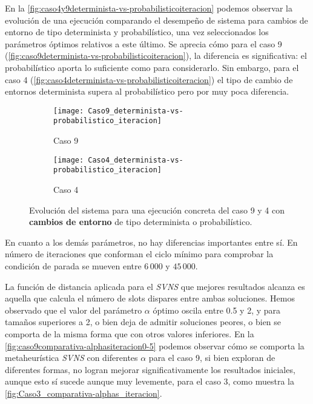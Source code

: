 En la \autoref{fig:caso4y9determinista-vs-probabilisticoiteracion} podemos observar la evolución de una ejecución comparando el desempeño de sistema para cambios de entorno de tipo determinista y probabilístico, una vez seleccionados los parámetros óptimos relativos a este último. Se aprecia cómo para el caso 9  (\autoref{fig:caso9determinista-vs-probabilisticoiteracion}), la diferencia es significativa: el probabilístico aporta lo suficiente como para considerarlo. Sin embargo, para el caso 4 (\autoref{fig:caso4determinista-vs-probabilisticoiteracion}) el tipo de cambio de entornos determinista supera al probabilístico pero por muy poca diferencia.

\begin{figure}[h]
	\begin{subfigure}{\linewidth}
		\centering
		\texttt{[image: Caso9\_determinista-vs-probabilistico\_iteracion]}
		\caption{Caso 9}
		\label{fig:caso9determinista-vs-probabilisticoiteracion}
	\end{subfigure}

	\begin{subfigure}{\linewidth}
		\centering
		\texttt{[image: Caso4\_determinista-vs-probabilistico\_iteracion]}
		\caption{Caso 4}
		\label{fig:caso4determinista-vs-probabilisticoiteracion}
	\end{subfigure}
	\caption{Evolución del sistema para una ejecución concreta del caso 9 y 4 con \textbf{cambios de entorno} de tipo determinista o probabilístico.}
	\label{fig:caso4y9determinista-vs-probabilisticoiteracion}
\end{figure}



En cuanto a los demás parámetros, no hay diferencias importantes entre sí. En número de iteraciones que conforman el ciclo mínimo para comprobar la condición de parada se mueven entre $6\,000$ y $45\,000$.

La función de distancia aplicada para el \textit{SVNS} que mejores resultados alcanza es aquella que calcula el número de slots dispares entre ambas soluciones. Hemos observado que el valor del parámetro $\alpha$ óptimo oscila entre 0.5 y 2, y para tamaños superiores a 2, o bien deja de admitir soluciones peores, o bien se comporta de la misma forma que con otros valores inferiores. En la \autoref{fig:caso9comparativa-alphasiteracion0-5} podemos observar cómo se comporta la metaheurística \textit{SVNS} con diferentes $\alpha$ para el caso 9, si bien exploran de diferentes formas, no logran mejorar significativamente los resultados iniciales, aunque esto sí sucede aunque muy levemente, para el caso 3, como muestra la \autoref{fig:Caso3_comparativa-alphas_iteracion}.

